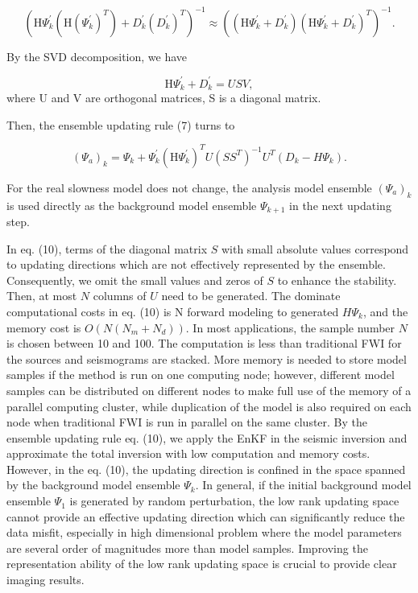 \documentclass[mreferee]{gji}
\begin{document}
\begin{equation}
\left(\mbox{H}\Psi_k^{'}(\mbox{H}(\Psi_k^{'})^T)+D_k^{'}(D_k^{'})^T\right)^{-1}\approx\left((\mbox{H}\Psi_k^{'}+D_k^{'})(\mbox{H}\Psi_k^{'}+D_k^{'})^T\right)^{-1}.
\end{equation}

By the SVD decomposition, we have

\begin{equation}
\mbox{H}\Psi_k^{'}+D_k^{'}=USV,
\end{equation}where U and V are orthogonal matrices, S is a diagonal matrix.

Then, the ensemble updating rule (7) turns to

\begin{equation}
(\Psi_a)_k=\Psi_k+\Psi_k^{'}(\mbox{H}\Psi_k^{'})^TU(SS^T)^{-1}U^T(D_k-H\Psi_k).
\end{equation}

For the real slowness model does not change, the analysis model ensemble $(\Psi_a)_k$ is used directly as the background model ensemble $\Psi_{k+1}$ in the next updating step.

In eq. (10), terms of the diagonal matrix $S$ with small absolute values correspond to updating directions which are not effectively represented by the ensemble. Consequently, we omit the small values and zeros of $S$ to enhance the stability. Then, at most $N$ columns of $U$ need to be generated. The dominate computational costs in eq. (10) is N forward modeling to generated $H\Psi_k$, and the memory cost is $O(N(N_m+N_d))$. In most applications, the sample number $N$ is chosen between 10 and 100. The computation is less than traditional FWI for the sources and seismograms are stacked. More memory is needed to store model samples if the method is run on one computing node; however, different model samples can be distributed on different nodes to make full use of the memory of a parallel computing cluster, while duplication of the model is also required on each node when traditional FWI is run in parallel on the same cluster. By the ensemble updating rule eq. (10), we apply the EnKF in the seismic inversion and approximate the total inversion with low computation and memory costs. However, in the eq. (10), the updating direction is confined in the space spanned by the background model ensemble $\Psi_k$. In general, if the initial background model ensemble $\Psi_1$ is generated by random perturbation, the low rank updating space cannot provide an effective updating direction which can significantly reduce the data misfit, especially in high dimensional problem where the model parameters are several order of magnitudes more than model samples. Improving the representation ability of the low rank updating space is crucial to provide clear imaging results.
\end{document}
